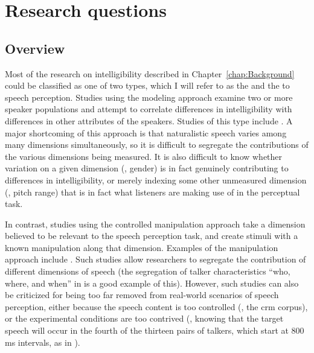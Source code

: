 \chapter{Research questions\label{chap:Questions}}

\section{Overview}
Most of the research on intelligibility described in Chapter~\ref{chap:Background} could be classified as one of two types, which I will refer to as the  and the  to speech perception.  Studies using the modeling approach examine two or more speaker populations and attempt to correlate differences in intelligibility with differences in other attributes of the speakers.  Studies of this type include \citet{BondMoore1994, BradlowEtAl1996, HazanMarkham2004, Neel2008}.  A major shortcoming of this approach is that naturalistic speech varies among many dimensions simultaneously, so it is difficult to segregate the contributions of the various dimensions being measured.  It is also difficult to know whether variation on a given dimension (\eg, gender) is in fact genuinely contributing to differences in intelligibility, or merely indexing some other unmeasured dimension (\eg, pitch range) that is in fact what listeners are making use of in the perceptual task.

In contrast, studies using the controlled manipulation approach take a dimension believed to be relevant to the speech perception task, and create stimuli with a known manipulation along that dimension.  Examples of the manipulation approach include \citet{KiddEtAl2005a, KitterickEtAl2010, DubnoEtAl2012}.  Such studies allow researchers to segregate the contribution of different dimensions of speech (the segregation of talker characteristics “who, where, and when” in \citet{KitterickEtAl2010} is a good example of this).  However, such studies can also be criticized for being too far removed from real-world scenarios of speech perception, either because the speech content is too controlled (\ie, the \ac{crm} corpus), or the experimental conditions are too contrived (\eg, knowing that the target speech will occur in the fourth of the thirteen pairs of talkers, which start at 800 ms intervals, as in \citealt{KitterickEtAl2010}).

